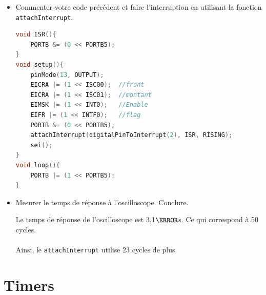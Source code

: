 \documentclass[a4paper,11pt]{article}
\begin{document}
\begin{itemize}
    \item Commenter votre code précédent et faire l'interruption en utilisant la fonction \texttt{attachInterrupt}.
    \begin{solution}
        \begin{lstlisting}[language=C++]
void ISR(){    
    PORTB &= (0 << PORTB5);
}
void setup(){
    pinMode(13, OUTPUT);
    EICRA |= (1 << ISC00);  //front
    EICRA |= (1 << ISC01);  //montant
    EIMSK |= (1 << INT0);   //Enable
    EIFR |= (1 << INTF0);   //flag
    PORTB &= (0 << PORTB5);
    attachInterrupt(digitalPinToInterrupt(2), ISR, RISING);
    sei();
}
void loop(){
    PORTB |= (1 << PORTB5);
}    
        \end{lstlisting}
    \end{solution}

    \item Mesurer le temps de réponse à l'oscilloscope. Conclure.
    \begin{solution}
        Le temps de réponse de l'oscilloscope est 3,1$\micro$s. Ce qui correspond à 50 cycles.\\\\
        Ainsi, le \texttt{attachInterrupt} utilise 23 cycles de plus.
    \end{solution}
\end{itemize}

\section{Timers}
\end{document}
